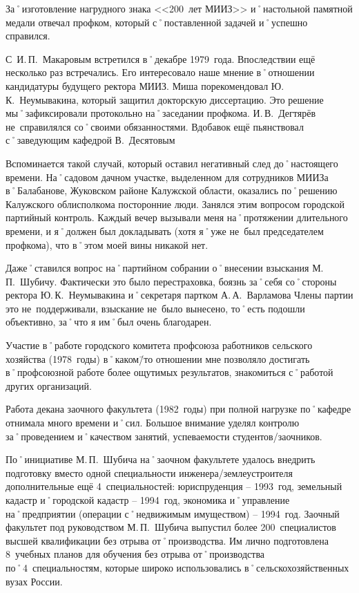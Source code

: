 За˚изготовление нагрудного знака <<200~лет МИИЗ>> и˚настольной памятной медали отвечал профком, который с˚поставленной задачей и˚успешно справился.

С~И.\,П.~Макаровым встретился в˚декабре 1979~года. Впоследствии ещё несколько раз встречались. Его интересовало наше мнение в˚отношении кандидатуры будущего ректора МИИЗ. Миша порекомендовал Ю.\,К.~Неумывакина, который защитил докторскую диссертацию. Это решение мы˚зафиксировали протокольно на˚заседании профкома. И.\,В.~Дегтярёв не~справилялся со˚своими обязанностями. Вдобавок ещё пьянствовал с˚заведующим кафедрой В.~Десятовым

Вспоминается такой случай, который оставил негативный след до˚настоящего времени. На˚садовом дачном участке, выделенном для сотрудников МИИЗа в˚Балабанове, Жуковском районе Калужской области, оказались по˚решению Калужского облисполкома посторонние люди. Занялся этим вопросом городской партийный контроль. Каждый вечер вызывали меня на˚протяжении длительного времени, и я˚должен был докладывать (хотя я˚уже не~был председателем профкома), что в˚этом моей вины никакой нет.

Даже˚ставился вопрос на˚партийном собрании о˚внесении взыскания М.\,П.~Шубичу. Фактически это было перестраховка, боязнь за˚себя со˚стороны ректора Ю.\,К.~Неумывакина и˚секретаря партком А.\,А.~Варламова Члены партии это не~поддерживали, взыскание не~было вынесено, то˚есть подошли объективно, за˚что я им˚был очень благодарен.

Участие в˚работе городского комитета профсоюза работников сельского хозяйства (1978~годы) в˚каком\=/то отношении мне позволяло достигать в˚профсоюзной работе более ощутимых результатов, знакомиться с˚работой других организаций.

Работа декана заочного факультета (1982~годы) при полной нагрузке по˚кафедре отнимала много времени и˚сил. Большое внимание уделял контролю за˚проведением и˚качеством занятий, успеваемости студентов\-/заочников.

По˚инициативе М.\,П.~Шубича на˚заочном факультете удалось внедрить подготовку вместо одной специальности инженера\-/землеустроителя дополнительные ещё 4~специальностей: юриспруденция \--- 1993~год, земельный кадастр и˚городской кадастр \--- 1994~год, экономика и˚управление на˚предприятии (операции с˚недвижимым имуществом) \--- 1994~год. Заочный факультет под руководством М.\,П.~Шубича выпустил более 200~специалистов высшей квалификации без отрыва от˚производства. Им лично подготовлена 8~учебных планов для обучения без отрыва от˚производства по˚4~специальностям, которые широко использовались в˚сельскохозяйственных вузах России. 


